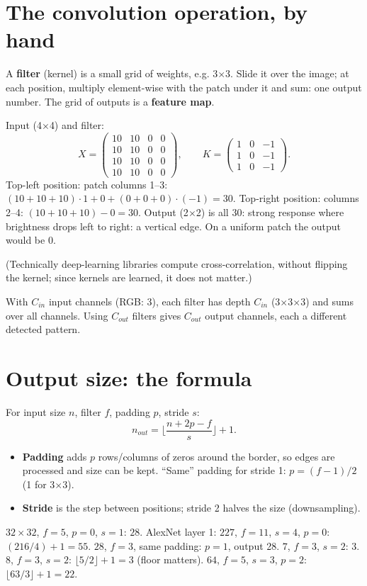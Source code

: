 \section{The convolution operation, by hand}
A \textbf{filter} (kernel) is a small grid of weights, e.g. 3$\times$3. Slide it over the image; at each position, multiply element-wise with the
patch under it and sum: one output number. The grid of outputs is a \textbf{feature map}.
\begin{example}
Input (4$\times$4) and filter:
\[ X = \begin{pmatrix}10&10&0&0\\10&10&0&0\\10&10&0&0\\10&10&0&0\end{pmatrix},\qquad
K = \begin{pmatrix}1&0&-1\\1&0&-1\\1&0&-1\end{pmatrix}. \]
Top-left position: patch columns 1--3: $(10 + 10 + 10)\cdot1 + 0 + (0 + 0 + 0)\cdot(-1) = 30$. Top-right position: columns 2--4:
$(10+10+10) - 0 = 30$. Output (2$\times$2) is all 30: strong response where brightness drops left to right: a vertical edge.
On a uniform patch the output would be 0.
\end{example}
(Technically deep-learning libraries compute cross-correlation, without flipping the kernel; since kernels are learned, it does not matter.)

With $C_{in}$ input channels (RGB: 3), each filter has depth $C_{in}$ (3$\times$3$\times$3) and sums over all channels. Using $C_{out}$ filters gives
$C_{out}$ output channels, each a different detected pattern.

\section{Output size: the formula}
For input size $n$, filter $f$, padding $p$, stride $s$:
\[ \boxed{n_{out} = \Big\lfloor\frac{n + 2p - f}{s}\Big\rfloor + 1.} \]
\begin{itemize}
\item \textbf{Padding} adds $p$ rows/columns of zeros around the border, so edges are processed and size can be kept. ``Same'' padding for stride 1:
  $p = (f-1)/2$ (1 for 3$\times$3).
\item \textbf{Stride} is the step between positions; stride 2 halves the size (downsampling).
\end{itemize}
\begin{example}
$32\times32$, $f = 5$, $p = 0$, $s = 1$: $28$. AlexNet layer 1: $227$, $f = 11$, $s = 4$, $p = 0$: $(216/4) + 1 = 55$.
$28$, $f = 3$, same padding: $p = 1$, output 28. $7$, $f = 3$, $s = 2$: $3$. $8$, $f = 3$, $s = 2$: $\lfloor5/2\rfloor + 1 = 3$ (floor matters).
$64$, $f = 5$, $s = 3$, $p = 2$: $\lfloor63/3\rfloor + 1 = 22$.
\end{example}


